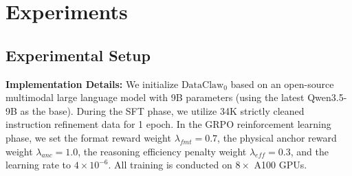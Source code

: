 


\section{Experiments}




\subsection{Experimental Setup}
\textbf{Implementation Details:} We initialize $\text{DataClaw}_0$ based on an open-source multimodal large language model with 9B parameters (using the latest Qwen3.5-9B as the base). During the SFT phase, we utilize 34K strictly cleaned instruction refinement data for 1 epoch. In the GRPO reinforcement learning phase, we set the format reward weight \(\lambda_{fmt}=0.7\), the physical anchor reward weight \(\lambda_{anc}=1.0\), the reasoning efficiency penalty weight \(\lambda_{eff}=0.3\), and the learning rate to \(4\times10^{-6}\). All training is conducted on $8\times$ A100 GPUs.


